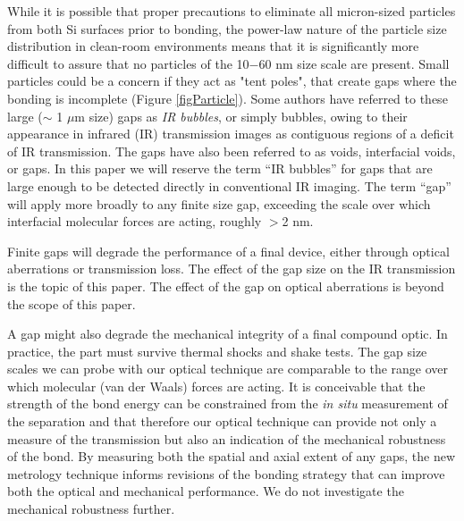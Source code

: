 \documentclass[osajnl,preprint,showpacs,superscriptaddress,12pt]{revtex4-1} %
\begin{document}
While it is possible that proper precautions to eliminate all micron-sized particles from both Si surfaces prior to bonding, the power-law nature of the particle size distribution in clean-room environments \cite{doi:10.1080/02786828608959094} means that it is significantly more difficult to assure that no particles of the 10$-$60 nm size scale are present.  Small particles could be a concern if they act as "tent poles", that create gaps where the bonding is incomplete (Figure \ref{figParticle}).  Some authors \cite{1991JaJAP..30..615M, 1992JEMat..21..669M, 1989JaJAP..28L2141L, Mitani1990} have referred to these large ($\sim$ 1 $\mu$m size) gaps as \emph{IR bubbles}, or simply bubbles, owing to their appearance in infrared (IR) transmission images as contiguous regions of a deficit of IR transmission.  The gaps have also been referred to as voids\cite{2000RScI...71.1869G}, interfacial voids, or gaps.  In this paper we will reserve the term ``IR bubbles'' for gaps that are large enough to be detected directly in conventional IR imaging.  The term ``gap'' will apply more broadly to any finite size gap, exceeding the scale over which interfacial molecular forces are acting, roughly $>$2 nm.  

Finite gaps will degrade the performance of a final device, either through optical aberrations or transmission loss.  The effect of the gap size on the IR transmission is the topic of this paper.  The effect of the gap on optical aberrations is beyond the scope of this paper.  

A gap might also degrade the mechanical integrity of a final compound optic.  In practice, the part must survive thermal shocks and shake tests.  The gap size scales we can probe with our optical technique are comparable to the range over which molecular (van der Waals) forces are acting.  It is conceivable that the strength of the bond energy can be constrained from the \emph{in situ} measurement of the separation and that therefore our optical technique can provide not only a measure of the transmission but also an indication of the mechanical robustness of the bond.  By measuring both the spatial and axial extent of any gaps, the new metrology technique informs revisions of the bonding strategy that can improve both the optical and mechanical performance.  We do not investigate the mechanical robustness further.  
\end{document}

